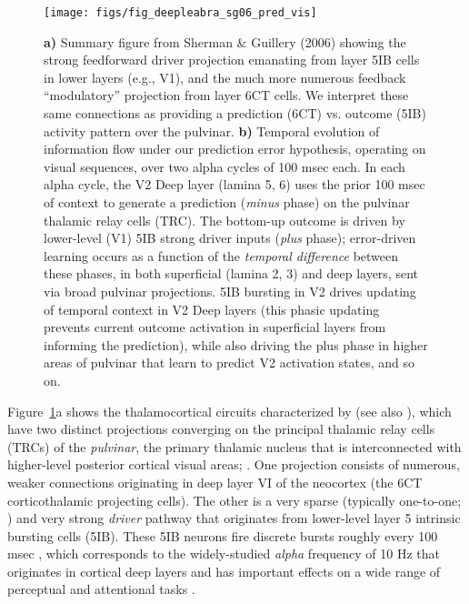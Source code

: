 \documentclass[11pt,twoside]{article}
\newif\myifpdf
\begin{document}
\begin{figure}
  \centering\texttt{[image: figs/fig\_deepleabra\_sg06\_pred\_vis]}
  \caption{{\bf a)} Summary figure from Sherman \& Guillery (2006) showing the strong feedforward driver projection emanating from layer 5IB cells in lower layers (e.g., V1), and the much more numerous feedback ``modulatory'' projection from layer 6CT cells.  We interpret these same connections as providing a prediction (6CT) vs. outcome (5IB) activity pattern over the pulvinar.  {\bf b)} Temporal evolution of information flow under our prediction error hypothesis, operating on visual sequences, over two alpha cycles of 100 msec each.  In each alpha cycle, the V2 Deep layer (lamina 5, 6) uses the prior 100 msec of context to generate a prediction (\emph{minus} phase) on the pulvinar thalamic relay cells (TRC). The bottom-up outcome is driven by lower-level (V1) 5IB strong driver inputs (\emph{plus} phase); error-driven learning occurs as a function of the \emph{temporal difference} between these phases, in both superficial (lamina 2, 3) and deep layers, sent via broad pulvinar projections. 5IB bursting in V2 drives updating of temporal context in V2 Deep layers (this phasic updating prevents current outcome activation in superficial layers from informing the prediction), while also driving the plus phase in higher areas of pulvinar that learn to predict V2 activation states, and so on.}
  \label{fig.sg06}
\end{figure}

Figure~\ref{fig.sg06}a shows the thalamocortical circuits characterized by  (see also ), which have two distinct projections converging on the principal thalamic relay cells (TRCs) of the \emph{pulvinar}, the primary thalamic nucleus that is interconnected with higher-level posterior cortical visual areas; \cite{Shipp03,ArcaroPinskKastner15}.  One projection consists of numerous, weaker connections originating in deep layer VI of the neocortex (the 6CT corticothalamic projecting cells).  The other is a very sparse (typically one-to-one; ) and very strong \emph{driver} pathway that originates from lower-level layer 5 intrinsic bursting cells (5IB).  These 5IB neurons fire discrete bursts roughly every 100 msec \cite{LarkumZhuSakmann99,FranceschettiGuatteoPanzicaEtAl95,LorinczKekesiJuhaszEtAl09,SaalmannPinskWangEtAl12}, which corresponds to the widely-studied \emph{alpha} frequency of 10 Hz that originates in cortical deep layers and has important effects on a wide range of perceptual and attentional tasks \cite{BuffaloFriesLandmanEtAl11,VanRullenKoch03,JensenBonnefondVanRullen12,FiebelkornKastner19}.
\end{document}
